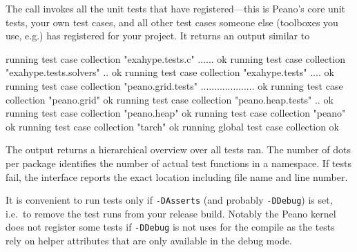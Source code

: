 \noindent
The call invokes all the unit tests that have registered---this is Peano's core
unit tests, your own test cases, and all other test cases someone else
(toolboxes you use, e.g.) has registered for your project.
It returns an output similar to
\begin{code}
running test case collection "exahype.tests.c" ...... ok                                                                                                                
running test case collection "exahype.tests.solvers" .. ok                                                                                                              
running test case collection "exahype.tests" .... ok                                                                                                                    
running test case collection "peano.grid.tests" .................... ok                                                                                                 
running test case collection "peano.grid"  ok                                                                                                                           
running test case collection "peano.heap.tests" .. ok                                                                                                                   
running test case collection "peano.heap"  ok                                                                                                                           
running test case collection "peano"  ok                                                                                                                                
running test case collection "tarch"  ok                                                                                                                                
running global test case collection  ok                                                                                                                                 
\end{code}

\noindent
The output returns a hierarchical overview over all tests ran. 
The number of dots per package identifies the number of actual test functions in
a namespace.
If tests fail, the interface reports the exact location including file name and
line number.


\begin{remark}
  It is convenient to run tests only if \texttt{-DAsserts} (and probably
  \texttt{-DDebug}) is set, i.e.~to remove the test runs from your release
  build.
  Notably the Peano kernel does not register some tests if \texttt{-DDebug} is
  not uses for the compile as the tests rely on helper attributes that are only
  available in the debug mode.
\end{remark}




